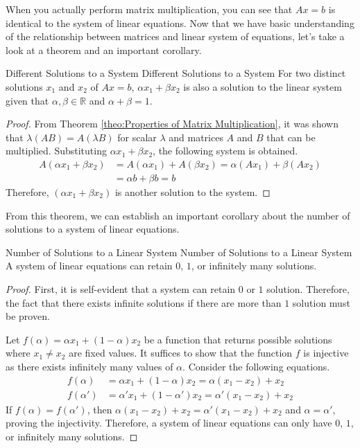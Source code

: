 \documentclass[../main.tex]{subfiles}
\begin{document}
When you actually perform matrix multiplication, you can see that
$Ax = b$ is identical to the system of linear equations. Now that
we have basic understanding of the relationship between matrices
and linear system of equations, let's take a look at a theorem and
an important corollary.

\begin{theorem}{Different Solutions to a System}
{Different Solutions to a System}
For two distinct solutions $x_1$ and $x_2$ of $Ax = b$,
$\alpha x_1 + \beta x_2$ is also a solution to the linear system
given that $\alpha, \beta \in \mathbb{R}$ and $\alpha + \beta = 1$.
\end{theorem}
\begin{proof}
From Theorem \ref{theo:Properties of Matrix Multiplication}, it was
shown that $\lambda (AB) = A (\lambda B)$ for scalar $\lambda$ and
matrices $A$ and $B$ that can be multiplied. Substituting $\alpha x_1
+ \beta x_2$, the following system is obtained.
\begin{align*}
    A (\alpha x_1 + \beta x_2)
    &= A(\alpha x_1) + A(\beta x_2)
    = \alpha (Ax_1) + \beta (Ax_2) \\
    &= \alpha b + \beta b
    = b
\end{align*}
Therefore, $(\alpha x_1 + \beta x_2)$ is another solution to the
system.
\end{proof}

From this theorem, we can establish an important corollary about the
number of solutions to a system of linear equations.

\begin{corollary}{Number of Solutions to a Linear System}
{Number of Solutions to a Linear System}
A system of linear equations can retain $0$, $1$, or infinitely many
solutions.
\end{corollary}
\begin{proof}
First, it is self-evident that a system can retain $0$ or $1$
solution. Therefore, the fact that there exists infinite solutions
if there are more than $1$ solution must be proven.

Let $f(\alpha) = \alpha x_1 + (1 - \alpha) x_2$ be a function that
returns possible solutions where $x_1 \neq x_2$ are fixed values.
It suffices to show that the function $f$ is injective as there exists
infinitely many values of $\alpha$. Consider the following equations.
\begin{align*}
    f(\alpha)
    &= \alpha x_1 + (1 - \alpha) x_2 
     = \alpha (x_1 - x_2) + x_2 \\
    f(\alpha')
    &= \alpha' x_1 + (1 - \alpha') x_2 
     = \alpha' (x_1 - x_2) + x_2
\end{align*}
If $f(\alpha) = f(\alpha')$, then $\alpha (x_1 - x_2) + x_2 =
\alpha' (x_1 - x_2) + x_2$ and $\alpha = \alpha'$, proving the
injectivity. Therefore, a system of linear equations can only have
$0$, $1$, or infinitely many solutions.
\end{proof}
\end{document}

